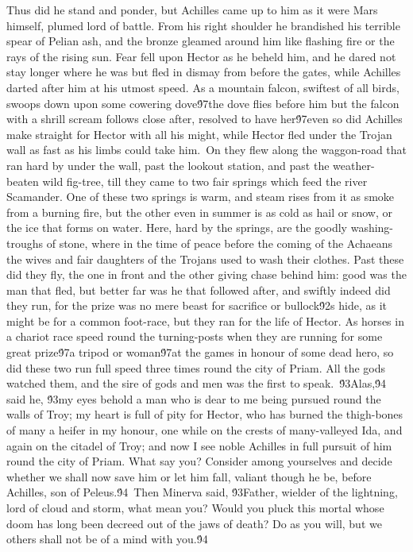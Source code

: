 {Thus did he stand and ponder, but Achilles came up to him as it were Mars himself, plumed lord of battle. From his right shoulder he brandished his terrible spear of Pelian ash, and the bronze gleamed around him like flashing fire or the rays of the rising sun. Fear fell upon Hector as he beheld him, and he dared not stay longer where he was but fled in dismay from before the gates, while Achilles darted after him at his utmost speed. As a mountain falcon, swiftest of all birds, swoops down upon some cowering dove\'97the dove flies before him but the falcon with a shrill scream follows close after, resolved to have her\'97even so did Achilles make straight for Hector with all his might, while Hector fled under the Trojan wall as fast as his limbs could take him.\
On they flew along the waggon-road that ran hard by under the wall, past the lookout station, and past the weather-beaten wild fig-tree, till they came to two fair springs which feed the river Scamander. One of these two springs is warm, and steam rises from it as smoke from a burning fire, but the other even in summer is as cold as hail or snow, or the ice that forms on water. Here, hard by the springs, are the goodly washing-troughs of stone, where in the time of peace before the coming of the Achaeans the wives and fair daughters of the Trojans used to wash their clothes. Past these did they fly, the one in front and the other giving chase behind him: good was the man that fled, but better far was he that followed after, and swiftly indeed did they run, for the prize was no mere beast for sacrifice or bullock\'92s hide, as it might be for a common foot-race, but they ran for the life of Hector. As horses in a chariot race speed round the turning-posts when they are running for some great prize\'97a tripod or woman\'97at the games in honour of some dead hero, so did these two run full speed three times round the city of Priam. All the gods watched them, and the sire of gods and men was the first to speak.\
\'93Alas,\'94 said he, \'93my eyes behold a man who is dear to me being pursued round the walls of Troy; my heart is full of pity for Hector, who has burned the thigh-bones of many a heifer in my honour, one while on the crests of many-valleyed Ida, and again on the citadel of Troy; and now I see noble Achilles in full pursuit of him round the city of Priam. What say you? Consider among yourselves and decide whether we shall now save him or let him fall, valiant though he be, before Achilles, son of Peleus.\'94\
Then Minerva said, \'93Father, wielder of the lightning, lord of cloud and storm, what mean you? Would you pluck this mortal whose doom has long been decreed out of the jaws of death? Do as you will, but we others shall not be of a mind with you.\'94\
}
